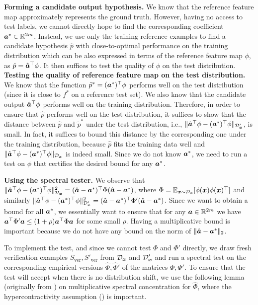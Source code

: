 \documentclass[11pt]{article} %
\numberwithin{equation}{section}
\begin{document}
\noindent\textbf{Forming a candidate output hypothesis.} We know that the reference feature map approximately represents the ground truth. However, having no access to test labels, we cannot directly hope to find the corresponding coefficient ${\bm{a}}^*\in\mathbb{R}^{2m}$. Instead, we use only the training reference examples to find a candidate hypothesis $\hat p$ with close-to-optimal performance on the training distribution which can be also expressed in terms of the reference feature map $\phi$, as $\hat p = \hat{{\bm{a}}}^\top \phi$. It then suffices to test the quality of $\phi$ on the test distribution.
\newpage
\noindent\textbf{Testing the quality of reference feature map on the test distribution.} We know that the function $\tilde{p}^* = ({\bm{a}}^*)^\top\phi$ performs well on the test distribution (since it is close to $f^*$ on a reference test set). We also know that the candidate output $\hat{{\bm{a}}}^\top \phi$ performs well on the training distribution. Therefore, in order to ensure that $\hat p$ performs well on the test distribution, it suffices to show that the distance between $\hat p$ and $\tilde{p}^*$ under the test distribution, i.e., $\|\hat{{\bm{a}}}^\top \phi -({\bm{a}}^*)^\top\phi\|_{{\mathcal{D}}_{{\bm{x}}}'}$, is small. In fact, it suffices to bound this distance by the corresponding one under the training distribution, because $\hat p$ fits the training data well and $\|\hat{{\bm{a}}}^\top \phi -({\bm{a}}^*)^\top\phi\|_{{\mathcal{D}}_{{\bm{x}}}}$ is indeed small. Since we do not know ${\bm{a}}^*$, we need to run a test on $\phi$ that certifies the desired bound for any ${\bm{a}}^*$. 


\noindent\textbf{Using the spectral tester.}
We observe that $\|\hat{{\bm{a}}}^\top \phi -({\bm{a}}^*)^\top\phi\|_{{\mathcal{D}}_{{\bm{x}}}}^2 = (\hat{{\bm{a}}} - {\bm{a}}^*)^\top \Phi (\hat{{\bm{a}}} - {\bm{a}}^*)$, where $\Phi = \mathbb{E}_{{\bm{x}}\sim{\mathcal{D}}_{{\bm{x}}}}[\phi({\bm{x}})\phi({\bm{x}})^\top]$ and similarly $\|\hat{{\bm{a}}}^\top \phi -({\bm{a}}^*)^\top\phi\|_{{\mathcal{D}}_{{\bm{x}}}'}^2 = (\hat{{\bm{a}}} - {\bm{a}}^*)^\top \Phi' (\hat{{\bm{a}}} - {\bm{a}}^*)$. Since we want to obtain a bound for all ${\bm{a}}^*$, we essentially want to ensure that for any ${\bm{a}}\in\mathbb{R}^{2m}$ we have ${\bm{a}}^\top \Phi' {\bm{a}} \le (1+\rho){\bm{a}}^\top \Phi {\bm{a}}$ for some small $\rho$. Having a multiplicative bound is important because we do not have any bound on the norm of $\|\hat{{\bm{a}}}-{\bm{a}}^*\|_2$. 

To implement the test, and since we cannot test $\Phi$ and $\Phi'$ directly, we draw fresh verification examples $S_{\mathrm{ver}}, S'_{\mathrm{ver}}$ from ${\mathcal{D}}_{{\bm{x}}}$ and ${\mathcal{D}}_{{\bm{x}}}'$ and run a spectral test on the corresponding empirical versions $\hat\Phi,\hat\Phi'$ of the matrices $\Phi,\Phi'$. To ensure that the test will accept when there is no distribution shift, we use the following lemma (originally from \cite{goel2024tolerant}) on multiplicative spectral concentration for $\hat\Phi$, where the hypercontractivity assumption () is important.
\end{document}
